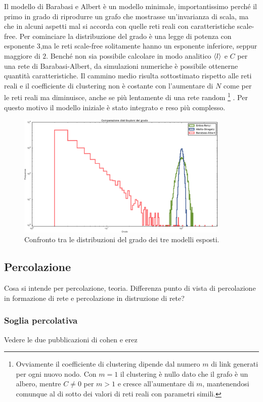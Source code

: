Il modello di Barabasi e Albert è un modello minimale, importantissimo perché il primo in grado di riprodurre un grafo che mostrasse un'invarianza di scala, ma che in alcuni aspetti mal si accorda con quelle reti reali con caratteristiche scale-free. Per cominciare la distribuzione del grado è una legge di potenza con esponente $3$,ma le reti scale-free solitamente hanno un esponente inferiore, seppur maggiore di $2$. Benché non sia possibile calcolare in modo analitico $\braket{l}$ e $C$ per una rete di Barabasi-Albert, da simulazioni numeriche è possibile ottenerne quantità caratteristiche. Il cammino medio risulta sottostimato rispetto alle reti reali e il coefficiente di clustering non è costante con l'aumentare di $N$ come per le reti reali ma diminuisce, anche se più lentamente di una rete random \footnote{Ovviamente il coefficiente di clustering dipende dal numero $m$ di link generati per ogni nuovo nodo. Con $m = 1$ il clustering \`e nullo dato che il grafo \`e un albero, mentre $C \neq 0$ per $m>1$ e cresce all'aumentare di $m$, mantenendosi comunque al di sotto dei valori di reti reali con parametri simili.}
. Per questo motivo il modello iniziale è stato integrato e reso più complesso.  

\begin{figure}[t!]
	\centering
	\includegraphics[width=0.9\textwidth]{./Immagini/Par1/compareSameN}
	\caption{Confronto tra le distribuzioni del grado dei tre modelli esposti.}
	\label{fig:barabalbero}
\end{figure}


\subsection{Percolazione} 
Cosa si intende per percolazione, teoria. Differenza punto di vista di percolazione in formazione di rete e percolazione in distruzione di rete?

\subsubsection{Soglia percolativa} 
Vedere le due pubblicazioni di cohen e erez


\clearpage